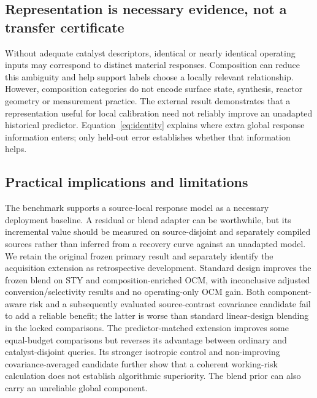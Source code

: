 \documentclass[11pt]{article}
\begin{document}
\subsection{Representation is necessary evidence, not a transfer certificate}
Without adequate catalyst descriptors, identical or nearly identical operating inputs may correspond to distinct material responses. Composition can reduce this ambiguity and help support labels choose a locally relevant relationship. However, composition categories do not encode surface state, synthesis, reactor geometry or measurement practice. The external result demonstrates that a representation useful for local calibration need not reliably improve an unadapted historical predictor. Equation~\ref{eq:identity} explains where extra global response information enters; only held-out error establishes whether that information helps.

\subsection{Practical implications and limitations}
The benchmark supports a source-local response model as a necessary deployment baseline. A residual or blend adapter can be worthwhile, but its incremental value should be measured on source-disjoint and separately compiled sources rather than inferred from a recovery curve against an unadapted model. We retain the original frozen primary result and separately identify the acquisition extension as retrospective development. Standard design improves the frozen blend on STY and composition-enriched OCM, with inconclusive adjusted conversion/selectivity results and no operating-only OCM gain. Both component-aware risk and a subsequently evaluated source-contrast covariance candidate fail to add a reliable benefit; the latter is worse than standard linear-design blending in the locked comparisons. The predictor-matched extension improves some equal-budget comparisons but reverses its advantage between ordinary and catalyst-disjoint queries. Its stronger isotropic control and non-improving covariance-averaged candidate further show that a coherent working-risk calculation does not establish algorithmic superiority. The blend prior can also carry an unreliable global component.
\end{document}
